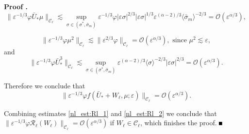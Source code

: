 \documentclass[letterpaper,11pt]{article}
\newcommand{\rmO}{\mathcal{O}}
\newcommand{\eps}{\varepsilon}
\newcommand{\lar}{ \lesssim }
\numberwithin{equation}{section}
\theoremstyle{plain}
\newenvironment{Proof}[1][\unskip]%
 {\begin{trivlist} \item[]{\bf Proof #1. }}%
 {\hspace*{\fill}$\rule{.4\baselineskip}{.4\baselineskip}$\end{trivlist}}
\begin{document}
\begin{Proof}
\[
\|\eps^{-1/3}\varphi \bar{U}_*\mu \|_{\mathcal{C}_\ell} \lar \sup_{\sigma \in (\sigma^{*},\bar{\sigma}_m)} \eps^{-1/3}\varphi |\eps\sigma|^{2/3}|\eps\sigma|^{1/3}\eps^{(\alpha-2)/3}\langle \bar{\sigma}_m\rangle^{-2/3}  = \rmO(\eps^{\alpha/3}),
\]

\[
\|\eps^{-1/3}\varphi \mu^2 \|_{\mathcal{C}_\ell} \lar \|\eps^{2/3}\varphi \|_{\mathcal{C}_\ell}= \rmO(\eps^{\alpha/3}), \text{ since } \mu^2 \lar \eps,
\]
and 
\[
\|\eps^{-1/3}\varphi \bar{U}_*^3 \|_{\mathcal{C}_\ell}  \lar \sup_{\sigma \in (\sigma^{*},\bar{\sigma}_m)}\eps^{(\alpha-2)/3}\langle \sigma\rangle^{-2/3} |\eps \sigma|^{2/3} = \rmO(\eps^{\alpha/3}).
\]

Therefore we conclude that
\begin{equation}\label{nl_est:Rl_2}
\|\eps^{-1/3}\varphi f(\bar{U}_*+W_\ell, \mu ;\eps)\|_{\mathcal{C}_\ell} = \rmO(\eps^{\alpha/3}).
\end{equation}

Combining estimates \eqref{nl_est:Rl_1} and \eqref{nl_est:Rl_2} we conclude that $\|\eps^{-1/3}\varphi \mathcal{R}_\ell(W_\ell)\|_{\mathcal{C}_\ell} = \rmO(\eps^{\alpha/3})$ if $W_\ell \in \mathcal{C}_\ell$, which finishes the proof.
\end{Proof}
\end{document}
